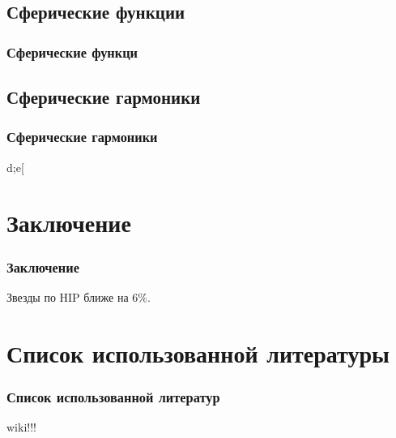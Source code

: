 \documentclass[14pt,aspectratio=43]{beamer}
\begin{document}
\subsection{Сферические функции}\label{sistem}  
\begin{frame}[<alignment>]
\frametitle{Сферические функци}

\end{frame}	

\subsection{Сферические гармоники}\label{sistem}  
\begin{frame}[<alignment>]
\frametitle{Сферические гармоники}
d;e[

\end{frame}	

\section{Заключение}\label{conclusion}
\begin{frame}[<alignment>]
\frametitle{Заключение}
Звезды по HIP ближе на $6\%$.


\end{frame}	


\section{Список использованной литературы}\label{conclusionlit}
\begin{frame}[<alignment>]
\frametitle{Список использованной литератур}
wiki!!!
\end{frame}	
\end{document}
